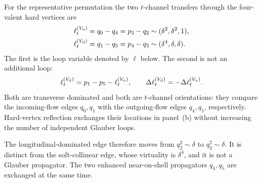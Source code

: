 \documentclass[a4paper,11pt]{article}
\begin{document}
For the representative permutation the two \(t\)-channel transfers through
the four-valent hard vertices are
\begin{align}
 \ell_t^{(V_{\rm u})}
 &=q_0-q_4=p_3-q_2
 \sim(\delta^2,\delta^2,1),\nonumber\\
 \ell_t^{(V_{\rm d})}
 &=q_1-q_5=p_4-q_3
 \sim(\delta^4,\delta,\delta).
 \label{eq:five-central-soft-two-t-channel-routings}
\end{align}
The first is the loop variable denoted by \(\ell\) below.  The second is not
an additional loop:
\begin{equation}
 \ell_t^{(V_{\rm d})}=p_1-p_5-\ell_t^{(V_{\rm u})},\qquad
 \Delta\ell_t^{(V_{\rm d})}=-\Delta\ell_t^{(V_{\rm u})}.
 \label{eq:five-central-soft-affine-glauber-routings}
\end{equation}
Both are transverse dominated and both are \(t\)-channel orientations:
they compare the incoming-flow edges \(q_0,q_1\) with the outgoing-flow
edges \(q_4,q_5\), respectively.  Hard-vertex reflection exchanges their
locations in panel~(b) without increasing the number of independent
Glauber loops.

The longitudinal-dominated edge therefore moves from
\(q_2^2\sim\delta\) to \(q_3^2\sim\delta\).  It is distinct from the
soft-collinear edge, whose virtuality is \(\delta^4\), and it is not a
Glauber propagator.  The two enhanced near-on-shell propagators \(q_4,q_5\)
are exchanged at the same time.
\end{document}
